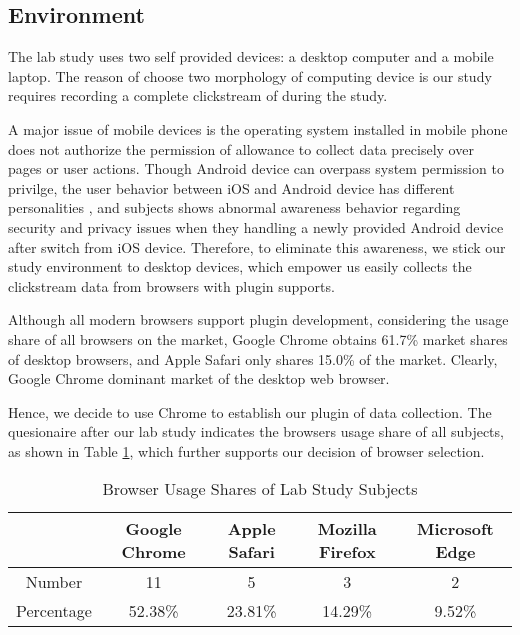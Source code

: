 \subsection{Environment}

The lab study uses two self provided devices: a desktop computer and a mobile laptop.
The reason of choose two morphology of computing device is our study requires recording
a complete clickstream of during the study.

A major issue of mobile devices is the operating system installed in mobile phone does not
authorize the permission of allowance to collect data precisely over pages or user actions.
Though Android device can overpass system permission to privilge, the user behavior 
between iOS and Android device has different personalities \cite{sandoio2018android}, 
and subjects shows \cite{reinfelder2014androidios} abnormal awareness behavior 
regarding security and privacy issues when they handling a newly provided Android device 
after switch from iOS device.
Therefore, to eliminate this awareness, we stick our study environment to desktop devices,
which empower us easily collects the clickstream data from browsers with plugin supports.

Although all modern browsers support plugin development, considering the usage share of 
all browsers on the market, Google Chrome \cite{wiki2018share} obtains 61.7\% 
market shares of desktop browsers, and Apple Safari only shares
15.0\% of the market. Clearly, Google Chrome dominant market of the desktop web browser.

Hence, we decide to use Chrome to establish our plugin of data collection.
The quesionaire after our lab study indicates the browsers usage share of all subjects, 
as shown in Table \ref{table:sharesubjects}, which further supports our decision of 
browser selection.

\begin{table}[H]
    \small
    \centering
    \setlength{\belowcaptionskip}{10pt}
    \caption{Browser Usage Shares of Lab Study Subjects}
    \begin{tabular}{ccccc}
          \toprule
        & \textbf{Google Chrome} & \textbf{Apple Safari} & \textbf{Mozilla Firefox} & \textbf{Microsoft Edge} \\
          \hline
          Number     & 11 & 5 & 3 & 2 \\
          Percentage & 52.38\% & 23.81\% & 14.29\% & 9.52\% \\
          \bottomrule
    \end{tabular}
    \label{table:sharesubjects}
\end{table}

